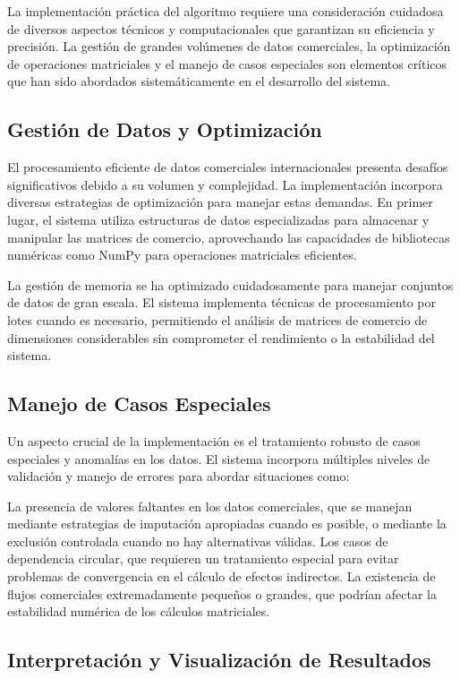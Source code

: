 \documentclass[authoryear]{elsarticle}
\begin{document}
La implementación práctica del algoritmo requiere una consideración cuidadosa de diversos aspectos técnicos y computacionales que garantizan su eficiencia y precisión. La gestión de grandes volúmenes de datos comerciales, la optimización de operaciones matriciales y el manejo de casos especiales son elementos críticos que han sido abordados sistemáticamente en el desarrollo del sistema.

\subsection{Gestión de Datos y Optimización}

El procesamiento eficiente de datos comerciales internacionales presenta desafíos significativos debido a su volumen y complejidad. La implementación incorpora diversas estrategias de optimización para manejar estas demandas. En primer lugar, el sistema utiliza estructuras de datos especializadas para almacenar y manipular las matrices de comercio, aprovechando las capacidades de bibliotecas numéricas como NumPy para operaciones matriciales eficientes.

La gestión de memoria se ha optimizado cuidadosamente para manejar conjuntos de datos de gran escala. El sistema implementa técnicas de procesamiento por lotes cuando es necesario, permitiendo el análisis de matrices de comercio de dimensiones considerables sin comprometer el rendimiento o la estabilidad del sistema.

\subsection{Manejo de Casos Especiales}

Un aspecto crucial de la implementación es el tratamiento robusto de casos especiales y anomalías en los datos. El sistema incorpora múltiples niveles de validación y manejo de errores para abordar situaciones como:

La presencia de valores faltantes en los datos comerciales, que se manejan mediante estrategias de imputación apropiadas cuando es posible, o mediante la exclusión controlada cuando no hay alternativas válidas. Los casos de dependencia circular, que requieren un tratamiento especial para evitar problemas de convergencia en el cálculo de efectos indirectos. La existencia de flujos comerciales extremadamente pequeños o grandes, que podrían afectar la estabilidad numérica de los cálculos matriciales.

\subsection{Interpretación y Visualización de Resultados}
\end{document}
